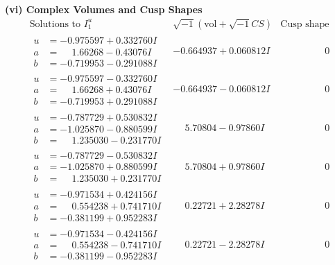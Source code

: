 \documentclass[1p]{elsarticle_modified}
\theoremstyle{definition}
\newcommand{\I}{\sqrt{-1}}
\begin{document}
\newpage\flushleft \textbf{(vi) Complex Volumes and Cusp Shapes}
$$\begin{array}{c|c|c}  
\text{Solutions to }I^u_{1}& \I (\text{vol} + \sqrt{-1}CS) & \text{Cusp shape}\\
 \hline 
\begin{aligned}
u &= -0.975597 + 0.332760 I \\
a &= \phantom{-}1.66268 - 0.43076 I \\
b &= -0.719953 - 0.291088 I\end{aligned}
 & -0.664937 + 0.060812 I & \phantom{-0.000000 } 0 \\ \hline\begin{aligned}
u &= -0.975597 - 0.332760 I \\
a &= \phantom{-}1.66268 + 0.43076 I \\
b &= -0.719953 + 0.291088 I\end{aligned}
 & -0.664937 - 0.060812 I & \phantom{-0.000000 } 0 \\ \hline\begin{aligned}
u &= -0.787729 + 0.530832 I \\
a &= -1.025870 - 0.880599 I \\
b &= \phantom{-}1.235030 - 0.231770 I\end{aligned}
 & \phantom{-}5.70804 - 0.97860 I & \phantom{-0.000000 } 0 \\ \hline\begin{aligned}
u &= -0.787729 - 0.530832 I \\
a &= -1.025870 + 0.880599 I \\
b &= \phantom{-}1.235030 + 0.231770 I\end{aligned}
 & \phantom{-}5.70804 + 0.97860 I & \phantom{-0.000000 } 0 \\ \hline\begin{aligned}
u &= -0.971534 + 0.424156 I \\
a &= \phantom{-}0.554238 + 0.741710 I \\
b &= -0.381199 + 0.952283 I\end{aligned}
 & \phantom{-}0.22721 + 2.28278 I & \phantom{-0.000000 } 0 \\ \hline\begin{aligned}
u &= -0.971534 - 0.424156 I \\
a &= \phantom{-}0.554238 - 0.741710 I \\
b &= -0.381199 - 0.952283 I\end{aligned}
 & \phantom{-}0.22721 - 2.28278 I & \phantom{-0.000000 } 0 \\ \hline\begin{aligned}

\end{aligned}
\end{array}$$
\end{document}

